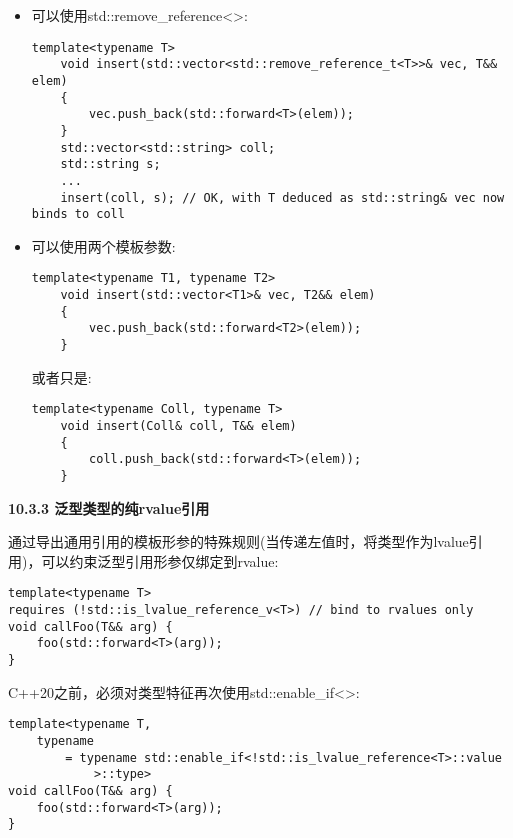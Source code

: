 \begin{itemize}
	\item 可以使用std::remove\_reference<>:
	\begin{lstlisting}[caption={}]
	template<typename T>
	void insert(std::vector<std::remove_reference_t<T>>& vec, T&& elem)
	{
		vec.push_back(std::forward<T>(elem));
	}
	std::vector<std::string> coll;
	std::string s;
	...
	insert(coll, s); // OK, with T deduced as std::string& vec now binds to coll
	\end{lstlisting}
	\item 可以使用两个模板参数:
	\begin{lstlisting}[caption={}]
	template<typename T1, typename T2>
	void insert(std::vector<T1>& vec, T2&& elem)
	{
		vec.push_back(std::forward<T2>(elem));
	}
	\end{lstlisting}
	或者只是:\par
	\begin{lstlisting}[caption={}]
	template<typename Coll, typename T>
	void insert(Coll& coll, T&& elem)
	{
		coll.push_back(std::forward<T>(elem));
	}
	\end{lstlisting}
\end{itemize}

\hspace*{\fill} \par %
\textbf{10.3.3 泛型类型的纯rvalue引用}

通过导出通用引用的模板形参的特殊规则(当传递左值时，将类型作为lvalue引用)，可以约束泛型引用形参仅绑定到rvalue:\par

\begin{lstlisting}[caption={}]
template<typename T>
requires (!std::is_lvalue_reference_v<T>) // bind to rvalues only
void callFoo(T&& arg) {
	foo(std::forward<T>(arg));
}
\end{lstlisting}

C++20之前，必须对类型特征再次使用std::enable\_if<>:\par

\begin{lstlisting}[caption={}]
template<typename T,
	typename
		= typename std::enable_if<!std::is_lvalue_reference<T>::value
			>::type>
void callFoo(T&& arg) {
	foo(std::forward<T>(arg));
}
\end{lstlisting}


